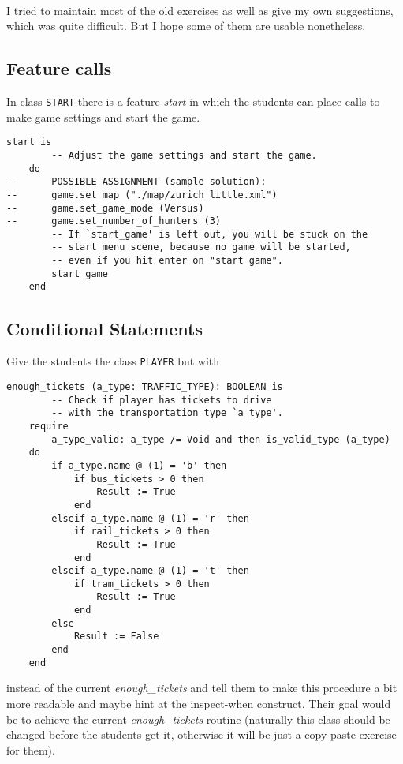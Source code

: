 \paragraph{}
I tried to maintain most of the old exercises as well as give my own suggestions, which was quite difficult. But I hope some of them are usable nonetheless.

\subsection{Feature calls}
In class \texttt{START} there is a feature \textit{start} in which the students can place calls to make game settings and start the game.

\begin{lstlisting}
start is
		-- Adjust the game settings and start the game.
	do
--		POSSIBLE ASSIGNMENT (sample solution):
--		game.set_map ("./map/zurich_little.xml")
--		game.set_game_mode (Versus)
--		game.set_number_of_hunters (3)
		-- If `start_game' is left out, you will be stuck on the 
		-- start menu scene, because no game will be started, 
		-- even if you hit enter on "start game".
		start_game
	end
\end{lstlisting}

\subsection{Conditional Statements}
Give the students the class \texttt{PLAYER} but with

\begin{lstlisting}
enough_tickets (a_type: TRAFFIC_TYPE): BOOLEAN is
		-- Check if player has tickets to drive 
		-- with the transportation type `a_type'.
	require 
		a_type_valid: a_type /= Void and then is_valid_type (a_type)
	do
		if a_type.name @ (1) = 'b' then
			if bus_tickets > 0 then
				Result := True
			end
		elseif a_type.name @ (1) = 'r' then
			if rail_tickets > 0 then
				Result := True
			end	
		elseif a_type.name @ (1) = 't' then
			if tram_tickets > 0 then
				Result := True
			end		
		else
			Result := False
		end
	end
\end{lstlisting}
instead of the current \textit{enough\_tickets} and tell them to make this procedure a bit more readable and maybe hint at the inspect-when construct. Their goal would be to achieve the current \textit{enough\_tickets} routine (naturally this class should be changed before the students get it, otherwise it will be just a copy-paste exercise for them).


